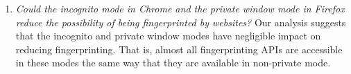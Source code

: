 \begin{enumerate}

\item {\em Could the incognito mode in Chrome and the private window mode in
Firefox reduce the possibility of being fingerprinted by websites?} Our analysis
suggests that the incognito and private window modes have negligible impact on
reducing fingerprinting. That is, almost all fingerprinting APIs are accessible
in these modes the same way that they are available in non-private mode.
    
\end{enumerate}

